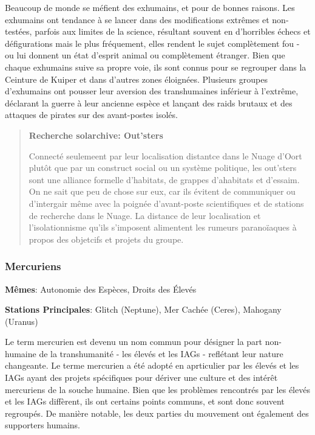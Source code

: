 Beaucoup de monde se méfient des exhumains, et pour de bonnes raisons. Les exhumains ont tendance à se lancer dans des modifications extrêmes et non-testées, parfois aux limites de la science, résultant souvent en d'horribles échecs et défigurations mais le plus fréquement, elles rendent le sujet complètement fou - ou lui donnent un état d'esprit animal ou complètement étranger. Bien que chaque exhumains suive sa propre voie, ils sont connus pour se regrouper dans la Ceinture de Kuiper et dans d'autres zones éloignées. Plusieurs groupes d'exhumains ont pousser leur aversion des transhumaines inférieur à l'extrême, déclarant la guerre à leur ancienne espèce et lançant des raids brutaux et des attaques de pirates sur des avant-postes isolés. 

\begin{quotation} \textbf{Recherche solarchive: Out'sters} 

Connecté seulemeent par leur localisation distantce dans le Nuage d'Oort plutôt que par un construct social ou un système politique, les out'sters sont une alliance formelle d'habitats, de grappes d'ahabitats et d'essaim. On ne sait que peu de chose sur eux, car ils évitent de communiquer ou d'intergair même avec la poignée d'avant-poste scientifiques et de stations de recherche dans le Nuage. La distance de leur localisation et l'isolationnisme qu'ils s'imposent alimentent les rumeurs paranoïaques à propos des objetcifs et projets du groupe. \end{quotation} 

\subsubsection{Mercuriens} \label{sec:mercurials} 

\textbf{Mêmes}: Autonomie des Espèces, Droits des Élevés 

\textbf{Stations Principales}: Glitch (Neptune), Mer Cachée (Ceres), Mahogany (Uranus) 

Le term mercurien est devenu un nom commun pour désigner la part non-humaine de la transhumanité - les élevés et les IAGs - reflétant leur nature changeante. Le terme mercurien a été adopté en aprticulier par les élevés et les IAGs ayant des projets spécifiques pour dériver une culture et des intérêt mercuriens de la souche humaine. Bien que les problèmes rencontrés par les élevés et les IAGs diffèrent, ils ont certains points communs, et sont donc souvent regroupés. De manière notable, les deux parties du mouvement ont également des supporters humains. 

